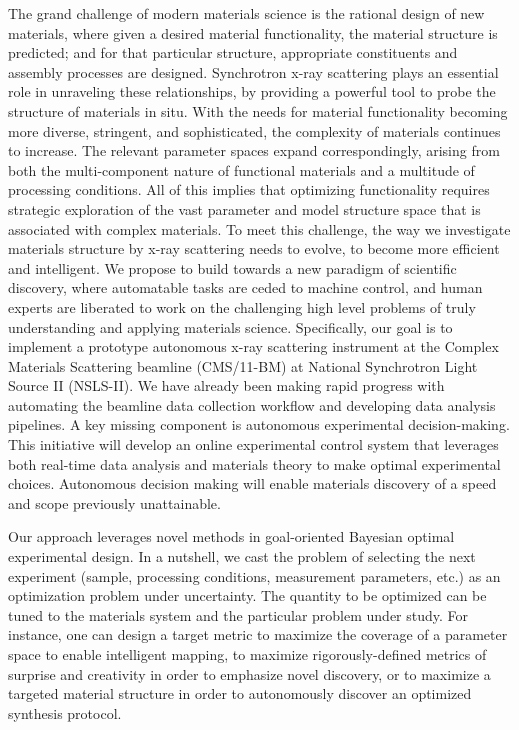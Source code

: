 \documentclass[11pt]{article}
\begin{document}
The grand challenge of modern materials science is the rational design
of new materials, where given a desired material functionality, the
material structure is predicted; and for that particular structure,
appropriate constituents and assembly processes are
designed. Synchrotron x-ray scattering plays an essential role in
unraveling these relationships, by providing a powerful tool to probe
the structure of materials in situ. With the needs for material
functionality becoming more diverse, stringent, and sophisticated, the
complexity of materials continues to increase. The relevant parameter
spaces expand correspondingly, arising from both the multi-component
nature of functional materials and a multitude of processing
conditions. All of this implies that optimizing functionality requires
strategic exploration of the vast parameter and model structure space
that is associated with complex materials. To meet this challenge, the
way we investigate materials structure by x-ray scattering needs to
evolve, to become more efficient and intelligent.  We propose to build
towards a new paradigm of scientific discovery, where automatable
tasks are ceded to machine control, and human experts are liberated to
work on the challenging high level problems of truly understanding and
applying materials science. Specifically, our goal is to implement a
prototype autonomous x-ray scattering instrument at the Complex
Materials Scattering beamline (CMS/11-BM) at National Synchrotron
Light Source II (NSLS-II). We have already been making rapid progress
with automating the beamline data collection workflow and developing
data analysis pipelines. A key missing component is autonomous
experimental decision-making. This initiative will develop an online
experimental control system that leverages both real-time data
analysis and materials theory to make optimal experimental
choices. Autonomous decision making will enable materials discovery of
a speed and scope previously unattainable.

Our approach leverages novel methods in goal-oriented Bayesian optimal
experimental design.  In a nutshell, we cast the problem of selecting
the next experiment (sample, processing conditions, measurement
parameters, etc.) as an optimization problem under uncertainty. The
quantity to be optimized can be tuned to the materials system and the
particular problem under study. For instance, one can design a target
metric to maximize the coverage of a parameter space to enable
intelligent mapping, to maximize rigorously-defined metrics of
surprise and creativity in order to emphasize novel discovery, or to
maximize a targeted material structure in order to autonomously
discover an optimized synthesis protocol.
\end{document}
